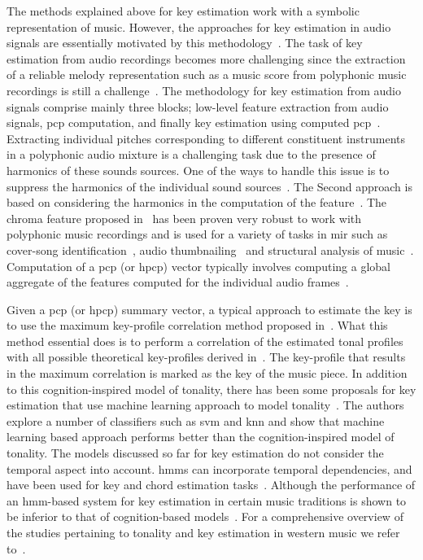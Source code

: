 {The methods explained above for key estimation work with a symbolic representation of music. However, the approaches for key estimation in audio signals are essentially motivated by this methodology~\citep{gomez2006tonal,pauws2004musical,peeters2006chroma}. The task of key estimation from audio recordings becomes more challenging since the extraction of a reliable melody representation such as a music score from polyphonic music recordings is still a challenge~\citep{gomez2006tonal}. The methodology for key estimation from audio signals comprise mainly three blocks; low-level feature extraction from audio signals, \gls{pcp} computation, and finally key estimation using computed \gls{pcp}~\cite{}. Extracting individual pitches corresponding to different constituent instruments in a polyphonic audio mixture is a challenging task due to the presence of harmonics of these sounds sources. One of the ways to handle this issue is to suppress the harmonics of the individual sound sources~\citep{cremer2004a,peeters2006chroma}. The Second approach is based on considering the harmonics in the computation of the feature~\citep{gomez2006tonal,izmirli2005template}. The chroma feature proposed in~\cite{gomez2006tonal} has been proven very robust to work with polyphonic music recordings and is used for a variety of tasks in \gls{mir} such as cover-song identification~\citep{joan_thesis}, audio thumbnailing~\citep{bartsch2001catch} and structural analysis of music~\citep{paulus2006music}. Computation of a \gls{pcp} (or \gls{hpcp}) vector typically involves computing a global aggregate of the features computed for the individual audio frames~\citep{izmirli2005template,pauws2004musical}. 

Given a \gls{pcp} (or \gls{hpcp}) summary vector, a typical approach to estimate the key is to use the maximum key-profile correlation method proposed in~\cite{krumhansl2001cognitive}. What this method essential does is to perform a correlation of the estimated tonal profiles with all possible theoretical key-profiles derived in~\cite{KrumhanslKessler82}. The key-profile that results in the maximum correlation is marked as the key of the music piece. In addition to this cognition-inspired model of tonality, there has been some proposals for key estimation that use machine learning approach to model tonality~\citep{gomez2004estimating}. The authors explore a number of classifiers such as \gls{svm} and \gls{knn} and show that machine learning based approach performs better than the cognition-inspired model of tonality. The models discussed so far for key estimation do not consider the temporal aspect into account. \glspl{hmm} can incorporate temporal dependencies, and have been used for key and chord estimation tasks~\cite{noland2006key,peeters2006musical,papadopoulos2007large}. Although the performance of an \gls{hmm}-based system for key estimation in certain music traditions is shown to be inferior to that of cognition-based models~\cite{peeters2006musical}. For a comprehensive overview of the studies pertaining to tonality and key estimation in western music we refer to~\cite{gomez2006tonal}.

}
